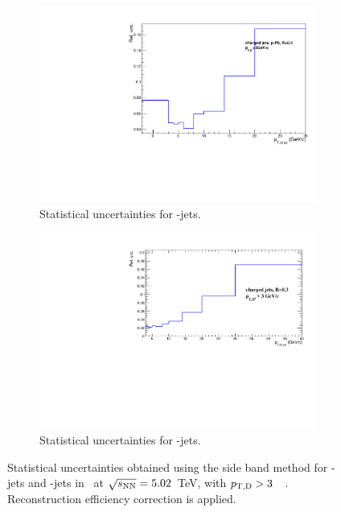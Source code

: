 \begin{figure}[bth]
\centering
\begin{subfigure}[b]{0.45\textwidth}
\includegraphics[width=\textwidth]{pPbplots/plotsSB_pt3_noDetails/jetPtSpectrumUnc_SB_Rebin_FASTwoSDD_pTD3}
\caption{Statistical uncertainties for \Dstar-jets.}
\label{fig:JetPt_pPb_SBUnc_Dstar}
\end{subfigure}
%
\begin{subfigure}[b]{0.45\textwidth}
\includegraphics[width=\textwidth,height=0.8\textwidth]{pPbplotsD0/Default/signalExtraction/plots/jetPtSpectrumUnc_SB_Rebin_LHC16R03_pTD3.pdf}
\caption{Statistical uncertainties for \Dzero-jets.}
\label{fig:JetPt_pPb_SBUnc_Dzero}
\end{subfigure}
\caption{Statistical uncertainties obtained using the side band method for \Dstar-jets and \Dzero-jets in \pPb\ at $\sqrt{s_{\rm NN}}=5.02$~TeV, with $p_{\mathrm{T,D}}>3$~\GeVc\ . Reconstruction efficiency correction is applied.}
\label{fig:JetPt_pPb_SBUnc_D}
\end{figure}

